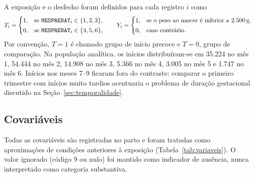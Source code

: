 \documentclass[11pt,a4paper]{article}
\newcommand{\campo}[1]{\texttt{#1}}       %
\begin{document}
A exposição e o desfecho foram definidos para cada registro $i$ como
\begin{equation}\label{eq:def}
T_i =
\begin{cases}
1, & \text{se } \campo{MESPRENAT}_i \in \{1,2,3\},\\[2pt]
0, & \text{se } \campo{MESPRENAT}_i \in \{4,5,6\},
\end{cases}
\qquad
Y_i =
\begin{cases}
1, & \text{se o peso ao nascer é inferior a 2.500\,g},\\[2pt]
0, & \text{caso contrário.}
\end{cases}
\end{equation}
Por convenção, $T=1$ é chamado grupo de início precoce e $T=0$, grupo de comparação. Na
população analítica, os inícios distribuíram-se em 35.224 no mês 1, 54.444 no mês 2,
14.908 no mês 3, 5.366 no mês 4, 3.005 no mês 5 e 1.747 no mês 6. Inícios nos meses 7--9
ficaram fora do contraste: comparar o primeiro trimestre com inícios muito tardios
acentuaria o problema de duração gestacional discutido na Seção~\ref{sec:temporalidade}.

\subsection{Covariáveis}\label{sec:covariaveis}

Todas as covariáveis são registradas no parto e foram tratadas como aproximações de
condições anteriores à exposição (Tabela~\ref{tab:variaveis}). O valor ignorado (código 9
ou nulo) foi mantido como indicador de ausência, nunca interpretado como categoria
substantiva.
\end{document}
